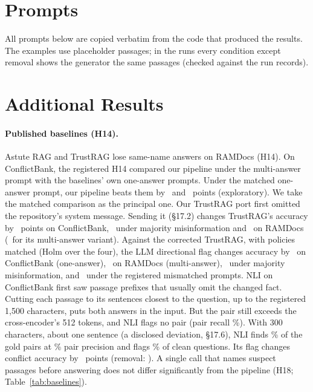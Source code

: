 \section{Prompts}
\label{app:prompts}
All prompts below are copied verbatim from the code that produced the results. The examples use placeholder passages; in the runs every condition except removal shows the generator the same passages (checked against the run records).


\section{Additional Results}
\label{app:extra}

\paragraph{Published baselines (H14).} Astute RAG \citep{wang2025astute} and TrustRAG \citep{zhou2025trustrag} lose same-name answers
on RAMDocs (H14). On ConflictBank, the registered H14 compared our pipeline under the multi-answer prompt with the
baselines' own one-answer prompts. Under the matched one-answer prompt, our pipeline beats them by \hFourteenMatchedAst\ and
\hFourteenMatchedTr\ points (exploratory). We take the matched comparison as the principal one. Our TrustRAG port
first omitted the repository's system message. Sending it (\S17.2) changes TrustRAG's accuracy by \blTrustSysCb\
points on ConflictBank, \blTrustSysMj\ under majority misinformation and \blTrustSysRd\ on RAMDocs (\blTrustSysRdMulti\
for its multi-answer variant). Against the corrected TrustRAG, with policies matched (Holm over the four), the LLM
directional flag changes accuracy by \blHFourteenCbs\ on ConflictBank (one-answer), \blHFourteenRd\ on RAMDocs (multi-answer),
\blHFourteenMj\ under majority misinformation, and \blHFourteenCb\ under the registered mismatched prompts.
NLI on ConflictBank first saw passage prefixes that usually omit the changed fact. Cutting each passage to its
sentences closest to the question, up to the registered 1,500 characters, puts both answers in the input. But the
pair still exceeds the cross-encoder's 512 tokens, and NLI flags no pair (pair recall \detNliWinRecall\%). With
300 characters, about one sentence (a disclosed deviation, \S17.6), NLI finds \detNliSentRecall\% of the gold pairs at
\detNliSentPrec\% pair precision and flags \detNliSentCleanFpr\% of clean questions. Its flag changes conflict
accuracy by \blNliSentFlag\ points (removal: \blNliSentRem). A single call that names suspect passages before
answering does not differ significantly from the pipeline (H18; Table~\ref{tab:baselines}).

